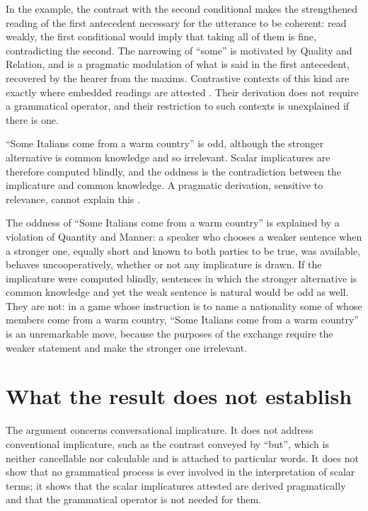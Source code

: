 \documentclass{situationist-preprint}
\begin{document}
\begin{reply}
In the example, the contrast with the second conditional makes the strengthened reading of the first antecedent necessary for the utterance to be coherent: read weakly, the first conditional would imply that taking all of them is fine, contradicting the second. The narrowing of \enquote{some} is motivated by Quality and Relation, and is a pragmatic modulation of what is said in the first antecedent, recovered by the hearer from the maxims. Contrastive contexts of this kind are exactly where embedded readings are attested \citep{GeurtsPouscoulous2009}. Their derivation does not require a grammatical operator, and their restriction to such contexts is unexplained if there is one.
\end{reply}

\begin{objection}[Blindness]\label{o:blind}
\enquote{Some Italians come from a warm country} is odd, although the stronger alternative is common knowledge and so irrelevant. Scalar implicatures are therefore computed blindly, and the oddness is the contradiction between the implicature and common knowledge. A pragmatic derivation, sensitive to relevance, cannot explain this \citep{Magri2009}.
\end{objection}

\begin{reply}
The oddness of \enquote{Some Italians come from a warm country} is explained by a violation of Quantity and Manner: a speaker who chooses a weaker sentence when a stronger one, equally short and known to both parties to be true, was available, behaves uncooperatively, whether or not any implicature is drawn. If the implicature were computed blindly, sentences in which the stronger alternative is common knowledge and yet the weak sentence is natural would be odd as well. They are not: in a game whose instruction is to name a nationality some of whose members come from a warm country, \enquote{Some Italians come from a warm country} is an unremarkable move, because the purposes of the exchange require the weaker statement and make the stronger one irrelevant.
\end{reply}

\section{What the result does not establish}

The argument concerns conversational implicature. It does not address conventional implicature, such as the contrast conveyed by \enquote{but}, which is neither cancellable nor calculable and is attached to particular words. It does not show that no grammatical process is ever involved in the interpretation of scalar terms; it shows that the scalar implicatures attested are derived pragmatically and that the grammatical operator is not needed for them.
\end{document}
